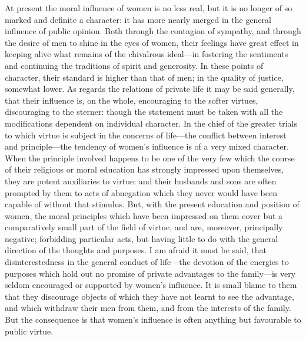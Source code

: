 \documentclass[12pt]{report}
\begin{document}
At present the moral influence of women is no less real, but it is no longer of so marked and definite a character: it has more nearly merged in the general influence of public opinion. Both through the contagion of sympathy, and through the desire of men to shine in the eyes of women, their feelings have great effect in keeping alive what remains of the chivalrous ideal—in fostering the sentiments and continuing the traditions of spirit and generosity. In these points of character, their standard is higher than that of men; in the quality of justice, somewhat lower. As regards the relations of private life it may be said generally, that their influence is, on the whole, encouraging to the softer virtues, discouraging to the sterner: though the statement must be taken with all the modifications dependent on individual character. In the chief of the greater trials to which virtue is subject in the concerns of life—the conflict between interest and principle—the tendency of women's influence is of a very mixed character. When the principle involved happens to be one of the very few which the course of their religious or moral education has strongly impressed upon themselves, they are potent auxiliaries to virtue: and their husbands and sons are often prompted by them to acts of abnegation which they never would have been capable of without that stimulus. But, with the present education and position of women, the moral principles which have been impressed on them cover but a comparatively small part of the field of virtue, and are, moreover, principally negative; forbidding particular acts, but having little to do with the general direction of the thoughts and purposes. I am afraid it must be said, that disinterestedness in the general conduct of life—the devotion of the energies to purposes which hold out no promise of private advantages to the family—is very seldom encouraged or supported by women's influence. It is small blame to them that they discourage objects of which they have not learnt to see the advantage, and which withdraw their men from them, and from the interests of the family. But the consequence is that women's influence is often anything but favourable to public virtue.
\end{document}
